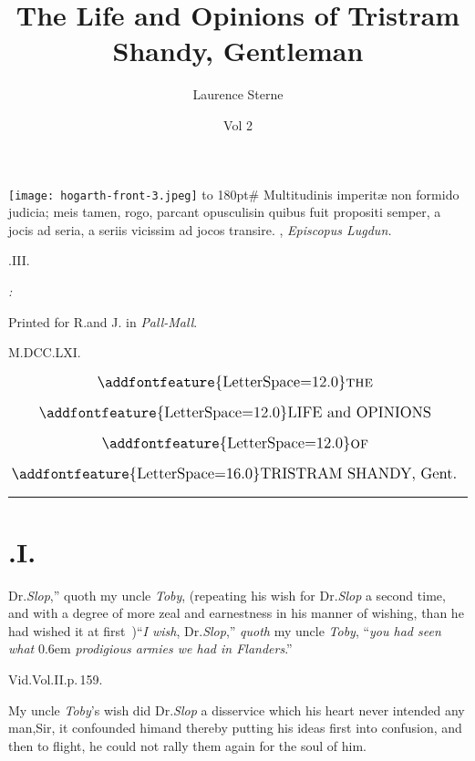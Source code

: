 \documentclass{article}
\title{The Life and Opinions of Tristram Shandy, Gentleman}
\author{Laurence Sterne}
\date{Vol 2}
\begin{document}
\pagestyle{empty}
\null\newpage
\noindent\texttt{[image: hogarth-front-3.jpeg]}
\newpage
\vbox{\openup 10pt}
\vfill
\vbox{\openup -2pt\halign to 180pt{\footnotesize #\cr
Multitudinis imperitæ non formido judicia; meis\cr
\quad tamen, rogo, parcant opusculis\tsh in quibus\cr
\quad fuit propositi semper, a jocis ad seria, a seriis\cr
\quad vicissim ad jocos transire.\hfill\cr
\hfill {},\cr
\hfill \textit{Episcopus Lugdun.}\cr}}
\vfill
\centerline{.\quad III.}
\vfill
\centerline{\itshape{}:}
\centerline{\smaller Printed for R.\@ and J.\@ {} in \textit{Pall-Mall}.}
\centerline{M.DCC.LXI.}
\newpage
\null
\newpage
\pagestyle{fancy}
\thispagestyle{empty}
\[\vbox{\openup 12pt\halign{\hss\large # \hss\cr
\addfontfeature{LetterSpace=12.0}\textsc{the}\cr
\addfontfeature{LetterSpace=12.0}LIFE and OPINIONS\cr
\addfontfeature{LetterSpace=12.0}\textsc{of}\cr
{\addfontfeature{LetterSpace=16.0}TRISTRAM SHANDY}, Gent.\cr}}\]

\vskip 12pt
\hrule
\setlength{\baselineskip}{14pt}  %
\setcounter{page}{5}
\section{.\quad  I.}

Dr.\@ \textit{Slop},” quoth my\break
uncle \textit{Toby}, (repeating his\break
wish for Dr.\@ \textit{Slop} a second time,
and with a degree of more zeal and earnestness in his manner of wishing, than he had
wished it at first \fnast\,)\tsh “\textit{I wish}, Dr.\@ \textit{Slop},” \textit{quoth} my
uncle \textit{Toby}, “\textit{you had seen what}\break
{}\kern 0.6em \textit{prodigious armies we had in Flanders}.”

\bgroup\footnotesize
\indent\fnast\enspace Vid.\@ Vol.\@ II.\@ p.\,159.\par
\egroup
{}
\newpage
My uncle \textit{Toby}’s wish did Dr.\@ \textit{Slop} a
disservice which his heart never intended any man,\tsh Sir, it
confounded him\tsh and thereby putting his ideas first into
confusion, and then to flight, he could not rally them again for
the soul of him.
\end{document}
